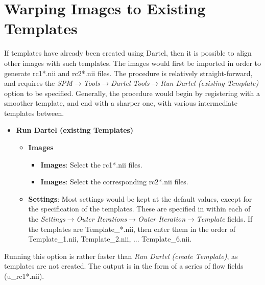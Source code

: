 \section{Warping Images to Existing Templates}
If templates have already been created using Dartel, then it is possible to align other images with such templates.
The images would first be imported in order to generate rc1*.nii and rc2*.nii files.
The procedure is relatively straight-forward, and requires the \emph{SPM$\rightarrow$Tools$\rightarrow$Dartel Tools$\rightarrow$Run Dartel (existing Template)} option to be specified.
Generally, the procedure would begin by registering with a smoother template, and end with a sharper one, with various intermediate templates between.
\begin{itemize}
\item{{\bf Run Dartel (existing Templates)}
  \begin{itemize}
  \item{{\bf Images}
    \begin{itemize}
    \item{{\bf Images}: Select the rc1*.nii files.}
    \item{{\bf Images}: Select the corresponding rc2*.nii files.}
    \end{itemize}
  }
  \item{{\bf Settings}: Most settings would be kept at the default values, except for the specification of the templates.
These are specified in within each of the \emph{Settings$\rightarrow$Outer Iterations$\rightarrow$Outer Iteration$\rightarrow$Template} fields.
If the templates are Template\_*.nii, then enter them in the order of Template\_1.nii, Template\_2.nii, ... Template\_6.nii.
  }
  \end{itemize}
}
\end{itemize}

Running this option is rather faster than \emph{Run Dartel (create Template)}, as templates are not created.
The output is in the form of a series of flow fields (u\_rc1*.nii).

